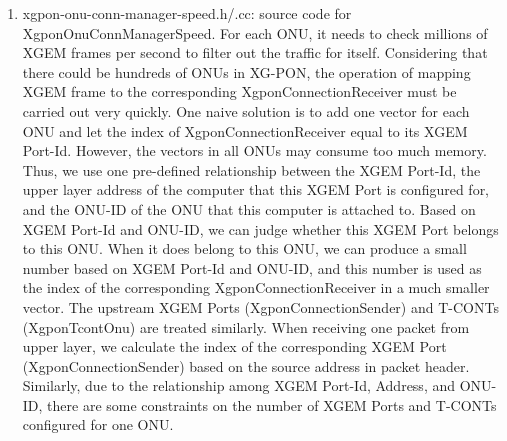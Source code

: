 \begin{enumerate}
 \item xgpon-onu-conn-manager-speed.h/.cc: source code for {\color{red} XgponOnuConnManagerSpeed}. For each ONU, it needs to 
check millions of XGEM frames per second to filter out the traffic for itself. Considering that there could be hundreds of ONUs 
in XG-PON, the operation of mapping XGEM frame to the corresponding XgponConnectionReceiver must be carried out very quickly. 
One naive solution is to add one vector for each ONU and let the index of XgponConnectionReceiver equal to its XGEM Port-Id. 
However, the vectors in all ONUs may consume too much memory. Thus, we use one pre-defined relationship between the XGEM Port-Id, 
the upper layer address of the computer that this XGEM Port is configured for, and the ONU-ID of the ONU that this computer 
is attached to. Based on XGEM Port-Id and ONU-ID, we can judge whether this XGEM Port belongs to this ONU. When it does 
belong to this ONU, we can produce a small number based on XGEM Port-Id and ONU-ID, and this number is used as the index 
of the corresponding XgponConnectionReceiver in a much smaller vector. The upstream XGEM Ports (XgponConnectionSender) 
and T-CONTs (XgponTcontOnu) are treated similarly. When receiving one packet from upper layer, we calculate the index of 
the corresponding XGEM Port (XgponConnectionSender) based on the source address in packet header. Similarly, due to the 
relationship among XGEM Port-Id, Address, and ONU-ID, there are some constraints on the number of XGEM Ports and T-CONTs 
configured for one ONU.


\end{enumerate}
